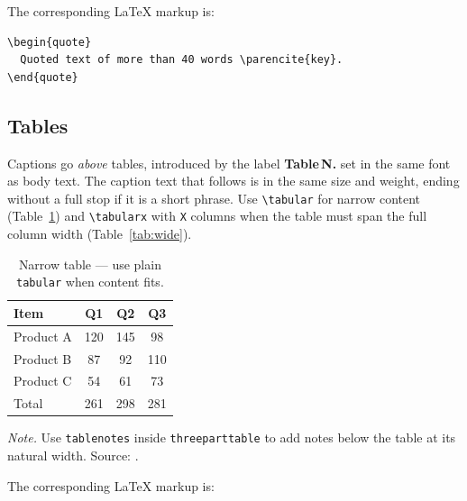\documentclass{wpom-upv}
\begin{document}
The corresponding \LaTeX{} markup is:

\begin{verbatim}
\begin{quote}
  Quoted text of more than 40 words \parencite{key}.
\end{quote}
\end{verbatim}


\subsection{Tables}

Captions go \emph{above} tables, introduced by the label
\textbf{Table\,N.} set in the same font as body text.
The caption text that follows is in the same size and weight, ending
without a full stop if it is a short phrase.
Use \verb|\tabular| for narrow content (Table~\ref{tab:narrow}) and
\verb|\tabularx| with \texttt{X} columns when the table must span the
full column width (Table~\ref{tab:wide}).

\begin{table}[ht]
  \centering
  \caption{Narrow table — use plain \texttt{tabular} when content fits.}
  \label{tab:narrow}
  \begin{threeparttable}
    \begin{tabular}{lccc}
      \toprule
      \textbf{Item} & \textbf{Q1} & \textbf{Q2} & \textbf{Q3} \\
      \midrule
      Product A & 120 & 145 &  98 \\
      Product B &  87 &  92 & 110 \\
      Product C &  54 &  61 &  73 \\
      \midrule
      Total     & 261 & 298 & 281 \\
      \bottomrule
    \end{tabular}
    \begin{tablenotes}
      \item \textit{Note.} Use \texttt{tablenotes} inside
            \texttt{threeparttable} to add notes below the table
            at its natural width. Source: \textcite{maringarcia2022case}.
    \end{tablenotes}
  \end{threeparttable}
\end{table}

The corresponding \LaTeX{} markup is:
\end{document}
